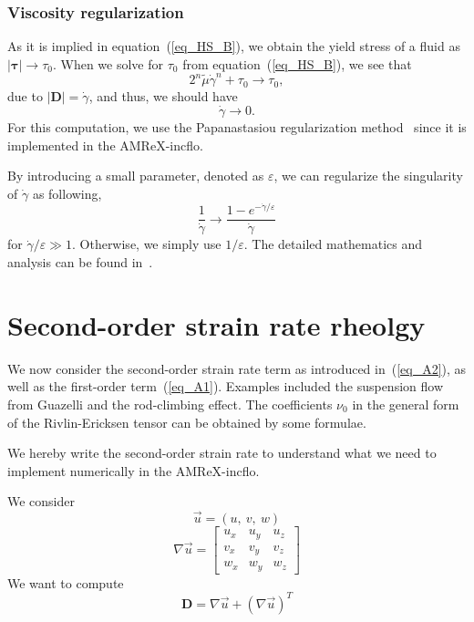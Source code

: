 \subsubsection{Viscosity regularization}
As it is implied in equation~(\ref{eq_HS_B}), we obtain the yield stress of a fluid as $|\bm{\tau}| \rightarrow \tau_0$. 
When we solve for $\tau_0$ from equation~(\ref{eq_HS_B}), we see that 
\begin{equation}
2^n \tilde{\mu} \dot{\gamma}^{n} + \tau_0
\rightarrow \tau_0,
\end{equation}
due to $|\bm{D}| = \dot{\gamma}$, and thus, we should have 
\begin{equation}
  \dot{\gamma} \rightarrow 0.
\end{equation}
For this computation, we use the Papanastasiou regularization method~\cite{papanastasiou_flows_1987} since it is implemented in the AMReX-incflo. 
\par
By introducing a small parameter, denoted as $\varepsilon$, we can regularize the singularity of $\dot{\gamma}$ as following,
\[
  \frac{1}{\dot{\gamma}} \rightarrow \frac{1-e^{-\dot{\gamma} / \varepsilon}}{\dot{\gamma}}  
\]
for $\dot{\gamma}/\varepsilon \gg 1$. Otherwise, we simply use $1/\varepsilon$. 
The detailed mathematics and analysis can be found in~\cite{sverdrup_highly_2018}.
\section{Second-order strain rate rheolgy}
We now consider the second-order strain rate term as introduced in~(\ref{eq_A2}), as well as the first-order term~(\ref{eq_A1}).
Examples included the suspension flow from Guazelli and the rod-climbing effect. The coefficients $\nu_0$ in the general form of the Rivlin-Ericksen tensor can be obtained by some formulae. 

We hereby write the second-order strain rate to understand what we need to implement numerically in the AMReX-incflo. 


We consider
\[
\vec{u}= (u, \ v, \ w)
\]
\[
\nabla \vec{u}
= 
\begin{bmatrix}
u_x & u_y & u_z
\\
v_x & v_y & v_z
\\
w_x & w_y & w_z
\end{bmatrix}
\]
We want to compute
\[
{\bm D} = \nabla \vec{u} + \left( \nabla \vec{u} \right)^T
\]


